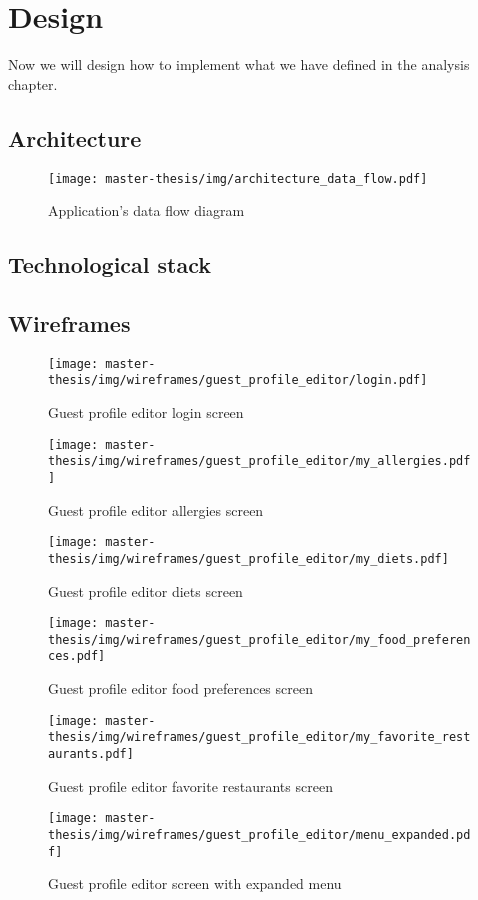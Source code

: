 \chapter{Design}
Now we will design how to implement what we have defined in the analysis chapter.

\section{Architecture}
\begin{figure}[h]
  \centering
  \texttt{[image: master-thesis/img/architecture\_data\_flow.pdf]}
  \caption{Application's data flow diagram}
\end{figure}

\section{Technological stack}

\section{Wireframes}
\begin{figure}[h]
  \centering
  \texttt{[image: master-thesis/img/wireframes/guest\_profile\_editor/login.pdf]}
  \caption{Guest profile editor login screen}
\end{figure}

\begin{figure}[h]
  \centering
  \texttt{[image: master-thesis/img/wireframes/guest\_profile\_editor/my\_allergies.pdf]}
  \caption{Guest profile editor allergies screen}
\end{figure}

\begin{figure}[h]
  \centering
  \texttt{[image: master-thesis/img/wireframes/guest\_profile\_editor/my\_diets.pdf]}
  \caption{Guest profile editor diets screen}
\end{figure}

\begin{figure}[h]
  \centering
  \texttt{[image: master-thesis/img/wireframes/guest\_profile\_editor/my\_food\_preferences.pdf]}
  \caption{Guest profile editor food preferences screen}
\end{figure}

\begin{figure}[h]
  \centering
  \texttt{[image: master-thesis/img/wireframes/guest\_profile\_editor/my\_favorite\_restaurants.pdf]}
  \caption{Guest profile editor favorite restaurants screen}
\end{figure}

\begin{figure}[h]
  \centering
  \texttt{[image: master-thesis/img/wireframes/guest\_profile\_editor/menu\_expanded.pdf]}
  \caption{Guest profile editor screen with expanded menu}
\end{figure}

\listoftodos